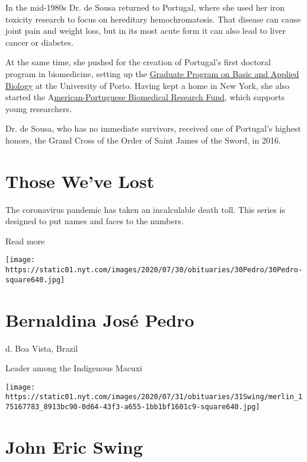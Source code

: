 In the mid-1980s Dr. de Sousa returned to Portugal, where she used her
iron toxicity research to focus on hereditary hemochromatosis. That
disease can cause joint pain and weight loss, but in its most acute form
it can also lead to liver cancer or diabetes.

At the same time, she pushed for the creation of Portugal's first
doctoral program in biomedicine, setting up the
\href{https://gabba.up.pt/}{Graduate Program on Basic and Applied
Biology} at the University of Porto. Having kept a home in New York, she
also started the A\href{https://www.apbrf.org/}{merican-Portuguese
Biomedical Research Fund}, which supports young researchers.

Dr. de Sousa, who has no immediate survivors, received one of Portugal's
highest honors, the Grand Cross of the Order of Saint James of the
Sword, in 2016.

\href{https://www.nytimes.com/interactive/2020/obituaries/people-died-coronavirus-obituaries.html?action=click\&pgtype=Article\&state=default\&region=BELOW_MAIN_CONTENT\&context=covid_obits_promo}{}

\hypertarget{those-weve-lost}{%
\section{Those We've Lost}\label{those-weve-lost}}

The coronavirus pandemic has taken an incalculable death toll. This
series is designed to put names and faces to the numbers.

Read more

\texttt{[image: https://static01.nyt.com/images/2020/07/30/obituaries/30Pedro/30Pedro-square640.jpg]}

\hypertarget{bernaldina-josuxe9-pedro}{%
\section{Bernaldina José Pedro}\label{bernaldina-josuxe9-pedro}}

d. Boa Vista, Brazil

Leader among the Indigenous Macuxi

\texttt{[image: https://static01.nyt.com/images/2020/07/31/obituaries/31Swing/merlin\_175167783\_8913bc90-0d64-43f3-a655-1bb1bf1601c9-square640.jpg]}

\hypertarget{john-eric-swing}{%
\section{John Eric Swing}\label{john-eric-swing}}

